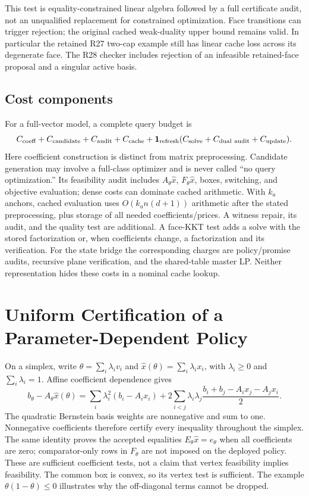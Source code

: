 This test is equality-constrained linear algebra followed by a full certificate audit, not an unqualified replacement for constrained optimization. Face transitions can trigger rejection; the original cached weak-duality upper bound remains valid. In particular the retained R27 two-cap example still has linear cache loss across its degenerate face. The R28 checker includes rejection of an infeasible retained-face proposal and a singular active basis.

\subsection{Cost components}
For a full-vector model, a complete query budget is
\[
 C_{\rm coeff}+C_{\rm candidate}+C_{\rm audit}+C_{\rm cache}
 +\mathbf1_{\rm refresh}(C_{\rm solve}+C_{\rm dual\ audit}+C_{\rm update}).
\]
Here coefficient construction is distinct from matrix preprocessing. Candidate generation may involve a full-class optimizer and is never called ``no query optimization.'' Its feasibility audit includes $A_\theta\widehat x$, $F_\theta\widehat x$, boxes, switching, and objective evaluation; dense costs can dominate cached arithmetic. With $k_a$ anchors, cached evaluation uses $O(k_a n(d+1))$ arithmetic after the stated preprocessing, plus storage of all needed coefficients/prices. A witness repair, its audit, and the quality test are additional. A face-KKT test adds a solve with the stored factorization or, when coefficients change, a factorization and its verification. For the state bridge the corresponding charges are policy/promise audits, recursive plane verification, and the shared-table master LP. Neither representation hides these costs in a nominal cache lookup.

\section{Uniform Certification of a Parameter-Dependent Policy}\label{ec:adaptiveuniform}
On a simplex, write $\theta=\sum_i\lambda_i v_i$ and $\widehat x(\theta)=\sum_i\lambda_i x_i$, with $\lambda_i\geq0$ and $\sum_i\lambda_i=1$. Affine coefficient dependence gives
\[
 b_\theta-A_\theta\widehat x(\theta)
 =\sum_i\lambda_i^2(b_i-A_ix_i)
 +2\sum_{i<j}\lambda_i\lambda_j
 \frac{b_i+b_j-A_ix_j-A_jx_i}{2}.
\]
The quadratic Bernstein basis weights are nonnegative and sum to one. Nonnegative coefficients therefore certify every inequality throughout the simplex. The same identity proves the accepted equalities $E_\theta\widehat x=e_\theta$ when all coefficients are zero; comparator-only rows in $F_\theta$ are not imposed on the deployed policy. These are sufficient coefficient tests, not a claim that vertex feasibility implies feasibility. The common box is convex, so its vertex test is sufficient. The example $\theta(1-\theta)\leq0$ illustrates why the off-diagonal terms cannot be dropped.

